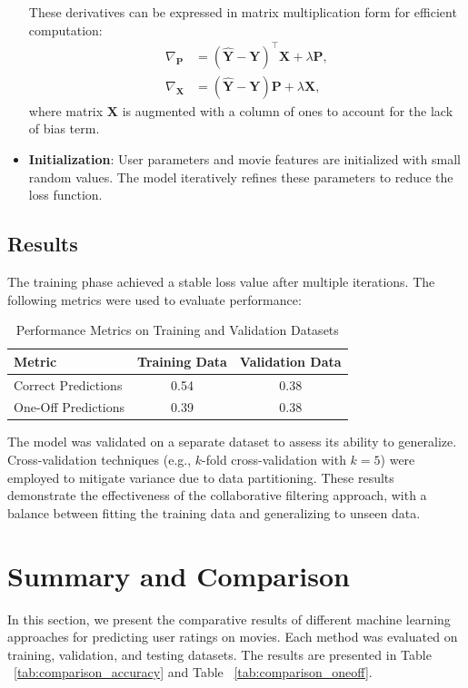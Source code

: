 \documentclass[a4paper,9pt]{article}
\begin{document}
\begin{itemize}
	      These derivatives can be expressed in matrix multiplication form for efficient computation:
	      \begin{align*}
		      \nabla_{\mathbf{P}} & = (\mathbf{\hat{Y}} - \mathbf{Y})^\top \mathbf{X} + \lambda \mathbf{P}, \\
		      \nabla_{\mathbf{X}} & = (\mathbf{\hat{Y}} - \mathbf{Y}) \mathbf{P} + \lambda \mathbf{X},
	      \end{align*}
	      where matrix $\mathbf{X}$ is augmented with a column of ones to account for the lack of bias term.
	\item \textbf{Initialization}:
	      User parameters and movie features are initialized with small random values. The model iteratively refines these parameters to reduce the loss function.
\end{itemize}

\subsection{Results}
The training phase achieved a stable loss value after multiple iterations.
The following metrics were used to evaluate performance:

\begin{table}[h]
	\centering
	\begin{tabular}{|l|c|c|}
		\hline
		\textbf{Metric}     & \textbf{Training Data} & \textbf{Validation Data} \\ \hline
		Correct Predictions & 0.54                   & 0.38                     \\ \hline
		One-Off Predictions & 0.39                   & 0.38                     \\ \hline
	\end{tabular}
	\caption{Performance Metrics on Training and Validation Datasets}
	\label{tab:predictions_metrics}
\end{table}

The model was validated on a separate dataset to assess its ability to generalize.
Cross-validation techniques (e.g., \(k\)-fold cross-validation with \(k=5\)) were employed to mitigate variance due to data partitioning.
These results demonstrate the effectiveness of the collaborative filtering approach, with a balance between
fitting the training data and generalizing to unseen data.

\clearpage
\section{Summary and Comparison}
In this section, we present the comparative results of different machine
learning approaches for predicting user ratings on movies.
Each method was evaluated on training, validation, and testing datasets.
The results are presented in Table ~\ref{tab:comparison_accuracy} and Table
~\ref{tab:comparison_oneoff}.
\end{document}
